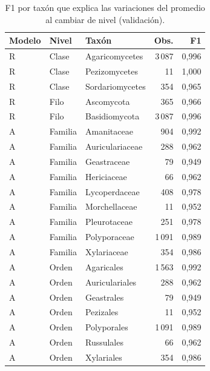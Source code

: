 \begin{table}[H]
\centering
\footnotesize
\caption{F1 por taxón que explica las variaciones del promedio al cambiar de nivel (validación).}
\label{tab:tax-diagnostics}
\begin{tabularx}{\linewidth}{l l Y r r}
\toprule
\textbf{Modelo} & \textbf{Nivel} & \textbf{Taxón} & \textbf{Obs.} & \textbf{F1}\\
\midrule
R & Clase & Agaricomycetes & 3\,087 & 0,996\\
R & Clase & Pezizomycetes & 11 & 1,000\\
R & Clase & Sordariomycetes & 354 & 0,965\\
R & Filo & Ascomycota & 365 & 0,966\\
R & Filo & Basidiomycota & 3\,087 & 0,996\\
A & Familia & Amanitaceae & 904 & 0,992\\
A & Familia & Auriculariaceae & 288 & 0,962\\
A & Familia & Geastraceae & 79 & 0,949\\
A & Familia & Hericiaceae & 66 & 0,962\\
A & Familia & Lycoperdaceae & 408 & 0,978\\
A & Familia & Morchellaceae & 11 & 0,952\\
A & Familia & Pleurotaceae & 251 & 0,978\\
A & Familia & Polyporaceae & 1\,091 & 0,989\\
A & Familia & Xylariaceae & 354 & 0,986\\
A & Orden & Agaricales & 1\,563 & 0,992\\
A & Orden & Auriculariales & 288 & 0,962\\
A & Orden & Geastrales & 79 & 0,949\\
A & Orden & Pezizales & 11 & 0,952\\
A & Orden & Polyporales & 1\,091 & 0,989\\
A & Orden & Russulales & 66 & 0,962\\
A & Orden & Xylariales & 354 & 0,986\\
\bottomrule
\end{tabularx}
\end{table}
